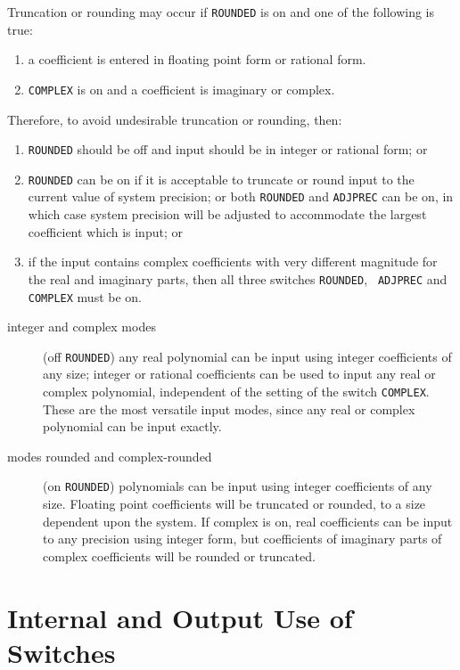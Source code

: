 Truncation or rounding may occur if {\tt ROUNDED} is on and
one of the following is true:

\begin{enumerate}
\item a coefficient is entered in floating point form or rational form.
\item {\tt COMPLEX} is on and a coefficient is imaginary or complex.
\end{enumerate}

Therefore, to avoid undesirable truncation or rounding, then:

\begin{enumerate}
\item {\tt ROUNDED} should be off and input should be
in integer or rational form; or
\item {\tt ROUNDED} can be on if it is acceptable to truncate or round
input to the current value of system precision; or both {\tt ROUNDED} and
{\tt ADJPREC} can be on, in which case system precision will be adjusted
to accommodate the largest coefficient which is input; or \item if the
input contains complex coefficients with very different magnitude for the
real and imaginary parts, then all three switches {\tt ROUNDED}, {\tt
ADJPREC} and {\tt COMPLEX} must be on.
\end{enumerate}

\begin{description}
\item[integer and complex modes] (off {\tt ROUNDED}) any real
polynomial can be input using integer coefficients of any size; integer or
rational coefficients can be used to input any real or complex polynomial,
independent of the setting of the switch {\tt COMPLEX}.  These are the most
versatile input modes, since any real or complex polynomial can be input
exactly.

\item[modes rounded and complex-rounded] (on {\tt ROUNDED}) polynomials can be 
input using
integer coefficients of any size.  Floating point coefficients will be
truncated or rounded, to a size dependent upon the system.  If complex
is on, real coefficients can be input to any precision using integer
form, but coefficients of imaginary parts of complex coefficients will
be rounded or truncated.
\end{description}

\section{Internal and Output Use of Switches}

